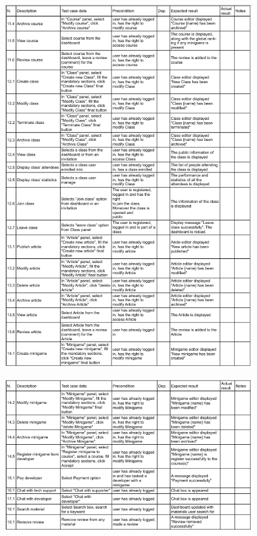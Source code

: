 \begin{figure}[H]
	\centering
	\includegraphics[width=1.0\linewidth]{images/test-case-2.png}
\end{figure}

\begin{figure}[H]
	\centering
	\includegraphics[width=1.0\linewidth]{images/test-case-3.png}
\end{figure}